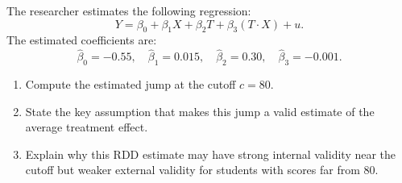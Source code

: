 \documentclass[12pt]{article}
\newif\ifsolutions
\begin{document}
\begin{enumerate}
    The researcher estimates the following regression:
    \[
        Y = \beta_0 + \beta_1X + \beta_2T + \beta_3(T\cdot X) + u.
    \]
    The estimated coefficients are:
    \[
        \widehat\beta_0 = -0.55, \quad
        \widehat\beta_1 = 0.015, \quad
        \widehat\beta_2 = 0.30, \quad
        \widehat\beta_3 = -0.001.
    \]

    \begin{enumerate}[label=(\alph*)]
        \item Compute the estimated jump at the cutoff \(c=80\).
        \item State the key assumption that makes this jump a valid estimate of the average treatment effect.
        \item Explain why this RDD estimate may have strong internal validity near the cutoff but weaker external validity for students with scores far from 80.
    \end{enumerate}

    \ifsolutions \color{blue} \textbf{Solution:} \\
    \begin{enumerate}[label=(\alph*)]
        \item In the one-regression formulation, the jump at cutoff \(c\) is
        \[
            \widehat\beta_2 + \widehat\beta_3 c.
        \]
        For \(c=80\):
        \[
            0.30 + (-0.001)(80) = 0.30 - 0.08 = 0.22.
        \]
        The estimated jump is 0.22, or 22 percentage points.

        \item The key assumption is that students just below and just above the cutoff are similar in all relevant respects except for receiving the scholarship (the treatment). Equivalently, potential outcomes should be continuous at the cutoff in the absence of treatment.
        \item The design compares students very close to the cutoff, so it can be credible for estimating the local effect of the scholarship around 80 points. However, this effect may not generalize to students with much lower or much higher exam scores, who may differ in motivation, preparation, financial need, or university plans.
    \end{enumerate}
    \fi \color{black}

\end{enumerate}
\end{document}
